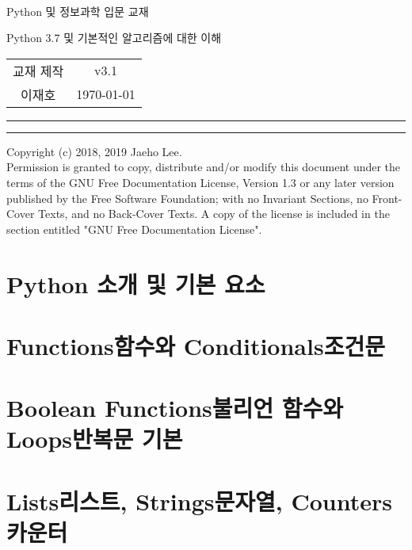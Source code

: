 \documentclass[a4paper, 10pt, twoside, calcwidth]{oblivoir}
\begin{document}
\begin{center}\sffamily
  \text{}\\[1cm]
  \huge Python 및 정보과학 입문 교재

  \vspace{.1cm}
  \Large Python 3.7 및 기본적인 알고리즘에 대한 이해\\[.6cm]
  \begin{tabular} {c c}
    교재 제작 & v3.1\\
    이재호 & \today
  \end{tabular}
\end{center}
\vspace{.5cm}
\noindent\rule[0.5ex]{\linewidth}{.5pt}
\tableofcontents*

\pagebreak
\mbox{}
\vfill
\noindent\rule[0.5ex]{\linewidth}{.5pt}
{\scriptsize
  \noindent Copyright (c)  2018, 2019  Jaeho Lee.\\
  Permission is granted to copy, distribute and/or modify this document
  under the terms of the GNU Free Documentation License, Version 1.3
  or any later version published by the Free Software Foundation;
  with no Invariant Sections, no Front-Cover Texts, and no Back-Cover Texts.
  A copy of the license is included in the section entitled "GNU
  Free Documentation License".
}

\pagebreak

\section{Python 소개 및 기본 요소}



\section{Functions함수와 Conditionals조건문}



\section{Boolean Functions불리언 함수와 Loops반복문 기본}

% 

\section{Lists리스트, Strings문자열, Counters카운터}
\end{document}
